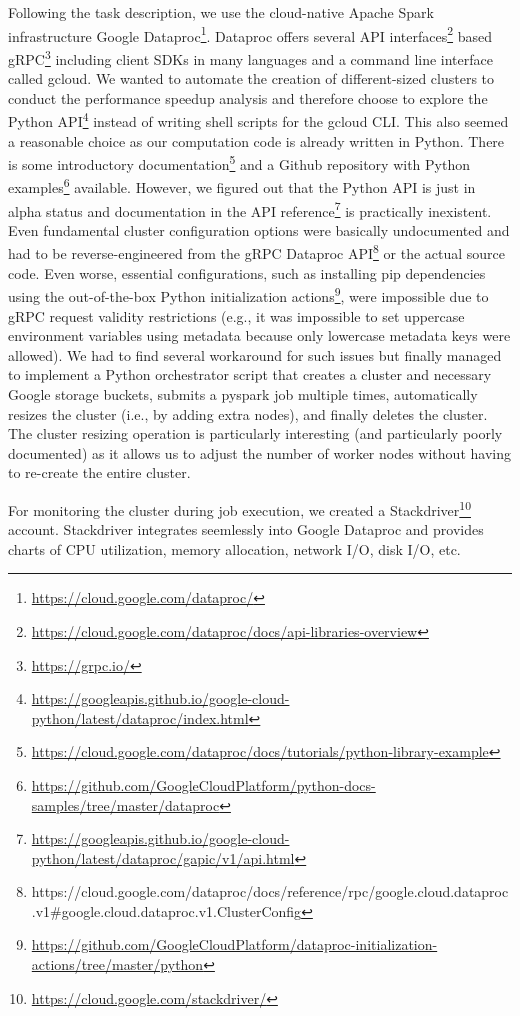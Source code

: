 \documentclass{prog_report}
\newcommand{\footurl}[1]{\footnote{\url{#1}}}
\begin{document}
Following the task description, we use the cloud-native Apache Spark infrastructure Google Dataproc\footurl{https://cloud.google.com/dataproc/}.
Dataproc offers several API interfaces\footurl{https://cloud.google.com/dataproc/docs/api-libraries-overview} based gRPC\footurl{https://grpc.io/} including client SDKs in many languages and a command line interface called gcloud.
We wanted to automate the creation of different-sized clusters to conduct the performance speedup analysis and therefore choose to explore the Python API\footurl{https://googleapis.github.io/google-cloud-python/latest/dataproc/index.html} instead of writing shell scripts for the gcloud CLI.
This also seemed a reasonable choice as our computation code is already written in Python.
There is some introductory documentation\footurl{https://cloud.google.com/dataproc/docs/tutorials/python-library-example} and a Github repository with Python examples\footurl{https://github.com/GoogleCloudPlatform/python-docs-samples/tree/master/dataproc} available.
However, we figured out that the Python API is just in alpha status and documentation in the API reference\footurl{https://googleapis.github.io/google-cloud-python/latest/dataproc/gapic/v1/api.html} is practically inexistent.
Even fundamental cluster configuration options were basically undocumented and had to be reverse-engineered from the gRPC Dataproc API\footnote{https://cloud.google.com/dataproc/docs/reference/rpc/google.cloud.dataproc.v1\#google.cloud.dataproc.v1.ClusterConfig} or the actual source code.
Even worse, essential configurations, such as installing pip dependencies using the out-of-the-box Python initialization actions\footurl{https://github.com/GoogleCloudPlatform/dataproc-initialization-actions/tree/master/python}, were impossible due to gRPC request validity restrictions (e.g., it was impossible to set uppercase environment variables using metadata because only lowercase metadata keys were allowed).
We had to find several workaround for such issues but finally managed to implement a Python orchestrator script that creates a cluster and necessary Google storage buckets, submits a pyspark job multiple times, automatically resizes the cluster (i.e., by adding extra nodes), and finally deletes the cluster.
The cluster resizing operation is particularly interesting (and particularly poorly documented) as it allows us to adjust the number of worker nodes without having to re-create the entire cluster.

For monitoring the cluster during job execution, we created a Stackdriver\footurl{https://cloud.google.com/stackdriver/} account.
Stackdriver integrates seemlessly into Google Dataproc and provides charts of CPU utilization, memory allocation, network I/O, disk I/O, etc.
\end{document}
